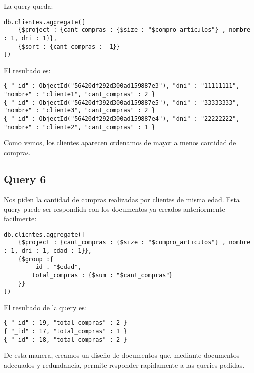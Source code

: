 La query queda:

\begin{verbatim}
db.clientes.aggregate([
	{$project : {cant_compras : {$size : "$compro_articulos"} , nombre : 1, dni : 1}},
	{$sort : {cant_compras : -1}}
])
\end{verbatim}

El resultado es:

\begin{verbatim}
{ "_id" : ObjectId("56420df292d300ad159887e3"), "dni" : "11111111", "nombre" : "cliente1", "cant_compras" : 2 }
{ "_id" : ObjectId("56420df392d300ad159887e5"), "dni" : "33333333", "nombre" : "cliente3", "cant_compras" : 2 }
{ "_id" : ObjectId("56420df292d300ad159887e4"), "dni" : "22222222", "nombre" : "cliente2", "cant_compras" : 1 }
\end{verbatim}

Como vemos, los clientes aparecen ordenamos de mayor a menos cantidad de compras.

\subsection{Query 6}
Nos piden la cantidad de compras realizadas por clientes de misma edad. Esta query puede ser respondida con los documentos ya creados anteriormente facilmente:

\begin{verbatim}
db.clientes.aggregate([
	{$project : {cant_compras : {$size : "$compro_articulos"} , nombre : 1, dni : 1, edad : 1}},
	{$group :{
		_id : "$edad",
		total_compras : {$sum : "$cant_compras"}
	}}
])
\end{verbatim}

El resultado de la query es:

\begin{verbatim}
{ "_id" : 19, "total_compras" : 2 }
{ "_id" : 17, "total_compras" : 1 }
{ "_id" : 18, "total_compras" : 2 }
\end{verbatim}

De esta manera, creamos un diseño de documentos que, mediante documentos adecuados y redundancia, permite responder rapidamente a las queries pedidas.
